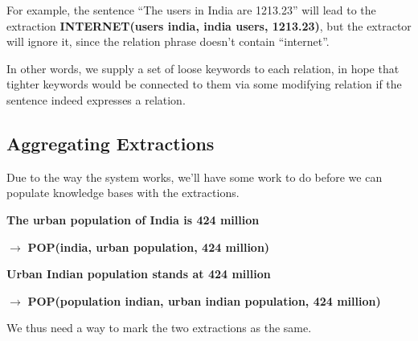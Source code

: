 \documentclass[a4paper,10pt]{article}
\begin{document}
For example, the sentence ``The users in India are 1213.23'' will lead to the extraction \textbf{\color{red} INTERNET(users india, india users, 1213.23)},
but the extractor will ignore it, since the relation phrase doesn't contain ``internet''.

In other words, we supply a set of loose keywords to each relation, in hope that tighter keywords would be connected to them via some modifying relation if the
sentence indeed expresses a relation.


 

\subsection{Aggregating Extractions}
Due to the way the system works, we'll have some work to do before we can populate knowledge bases with the extractions.

\textbf{The urban population of India is 424 million} 

$\rightarrow$ \textbf{\color{red} POP(india, urban population, 424 million)}


\textbf{Urban Indian population stands at 424 million}

$\rightarrow$ \textbf{\color{red} POP(population indian, urban indian population, 424 million)}

We thus need a way to mark the two extractions as the same.


\printbibliography[title=References]
\end{document}
